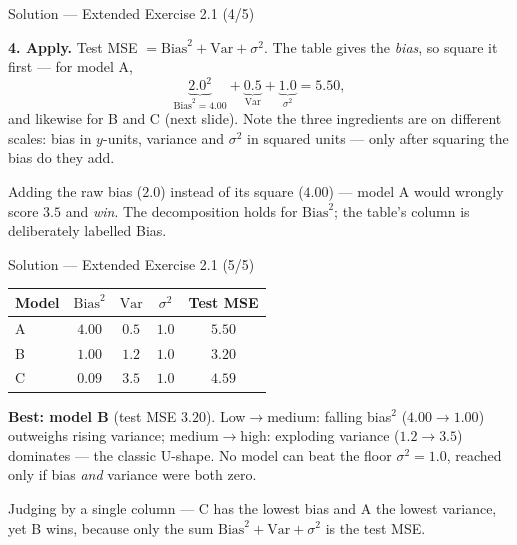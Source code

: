 \documentclass[aspectratio=169,11pt]{beamer}
\begin{document}
\begin{frame}{Solution --- Extended Exercise 2.1 (4/5)}
\begin{solutionbox}
\textbf{4. Apply.} Test MSE $=\mathrm{Bias}^2+\mathrm{Var}+\sigma^2$.
The table gives the \emph{bias}, so square it first --- for model A,
\[
  \underbrace{2.0^2}_{\mathrm{Bias}^2 = 4.00}
  + \underbrace{0.5}_{\mathrm{Var}}
  + \underbrace{1.0}_{\sigma^2}
  = 5.50 ,
\]
and likewise for B and C (next slide). Note the three ingredients are on
different scales: bias in $y$-units, variance and $\sigma^2$ in squared
units --- only after squaring the bias do they add.
\end{solutionbox}
\begin{mistake}
Adding the raw bias ($2.0$) instead of its square ($4.00$) --- model A
would wrongly score $3.5$ and \emph{win}. The decomposition holds for
$\mathrm{Bias}^2$; the table's column is deliberately labelled Bias.
\end{mistake}
\end{frame}

\begin{frame}{Solution --- Extended Exercise 2.1 (5/5)}
\begin{solutionbox}
\vspace{-1mm}
\begin{center}\footnotesize
\begin{tabular}{lcccc}
\toprule
Model & $\mathrm{Bias}^2$ & $\mathrm{Var}$ & $\sigma^2$ & Test MSE \\
\midrule
A & $4.00$ & $0.5$ & $1.0$ & $\mathbf{5.50}$ \\
B & $1.00$ & $1.2$ & $1.0$ & $\mathbf{3.20}$ \\
C & $0.09$ & $3.5$ & $1.0$ & $\mathbf{4.59}$ \\
\bottomrule
\end{tabular}
\end{center}
\vspace{-1mm}
\textbf{Best: model B} (test MSE $3.20$). Low$\to$medium: falling bias$^2$ ($4.00\to1.00$) outweighs rising variance; medium$\to$high: exploding variance ($1.2\to3.5$) dominates --- the classic U-shape. No model can beat the floor $\sigma^2=1.0$, reached only if bias \emph{and} variance were both zero.
\end{solutionbox}
\begin{mistake}
Judging by a single column --- C has the lowest bias and A the lowest variance, yet B wins, because only the sum $\mathrm{Bias}^2+\mathrm{Var}+\sigma^2$ is the test MSE.
\end{mistake}
\end{frame}
\end{document}
